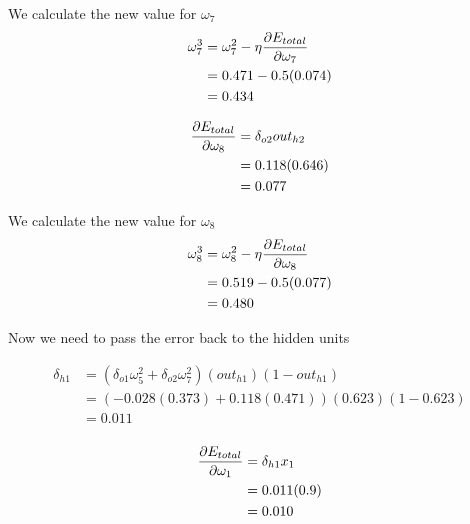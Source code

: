 \documentclass[10pt,a4paper]{article}
\begin{document}
We calculate the new value for $\omega_7$
\begin{equation}
\begin{split}
\omega_7^3 &= \omega_7^2 - \eta\pdv{E_{total}}{\omega_7}\\
           &= 0.471 -0.5(0.074)\\
           &= 0.434\\
\end{split}
\end{equation}

\begin{equation}
\begin{split}
\pdv{E_{total}}{\omega_8} &= \delta_{o2}out_{h2}\\
                          &= 0.118(0.646)\\
                          &= 0.077\\
\end{split}
\end{equation}

We calculate the new value for $\omega_8$
\begin{equation}
\begin{split}
\omega_8^3 &= \omega_8^2 - \eta\pdv{E_{total}}{\omega_8}\\
           &= 0.519 -0.5(0.077)\\
           &= 0.480\\
\end{split}
\end{equation}







Now we need to pass the error back to the hidden units

\begin{equation}
\begin{split}
\delta_{h1} &= (\delta_{o1}\omega_5^2 + \delta_{o2}\omega_7^2)(out_{h1})(1-out_{h1})\\
&= (-0.028(0.373) +0.118(0.471))(0.623)(1-0.623)\\
&= 0.011\\
\end{split}
\end{equation}

\begin{equation}
\begin{split}
\pdv{E_{total}}{\omega_1} &= \delta_{h1}x_1\\ 
                          &= 0.011(0.9)\\
                          &= 0.010\\
\end{split}
\end{equation}
\end{document}
